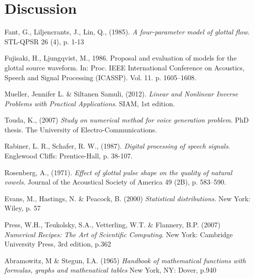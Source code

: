 \documentclass[12pt,a4]{article}
\begin{document}
\section{Discussion}\label{sec:discussion}

\newpage
\begin{thebibliography}{9}

    Fant, G., Liljencrants, J., Lin, Q., (1985).
    \emph{A four-parameter model of glottal flow}.
    STL-QPSR 26 (4), p. 1-13
    
    Fujisaki, H., Ljungqvist, M., 1986.
    Proposal and evaluation of models for the glottal source waveform.
    In: Proc. IEEE International Conference on Acoustics, Speech and Signal Processing (ICASSP). Vol. 11. p. 1605–1608.
    
	Mueller, Jennifer L. \& Siltanen Samuli, (2012).
	\emph{Linear and Nonlinear Inverse Problems with Practical Applications}.
	SIAM, 1st edition.
	
    Touda, K., (2007)
    \emph{Study on numerical method for voice generation problem}.
    PhD thesis.
    The University of Electro-Communications.
    
    Rabiner, L. R., Schafer, R. W., (1987).
    \emph{Digital processing of speech signals}.
    Englewood Cliffs: Prentice-Hall, p. 38-107.

    Rosenberg, A., (1971).
    \emph{Effect of glottal pulse shape on the quality of natural vowels}.
    Journal of the Acoustical Society of America 49 (2B), p. 583–590.
    
    Evans, M., Hastings, N. \& Peacock, B. (2000)
    \emph{Statistical distributions}.
    New York: Wiley, p. 57
    
    Press, W.H., Teukolsky, S.A., Vetterling, W.T. \& Flannery, B.P. (2007)
    \emph{Numerical Recipes: The Art of Scientific Computing}.
    New York: Cambridge University Press, 3rd edition, p.362
    
    Abramowitz, M \& Stegun, I.A. (1965)
    \emph{Handbook of mathematical functions with formulas, graphs and mathenatical tables}
    New York, NY: Dover, p.940

\end{thebibliography}
\end{document}
